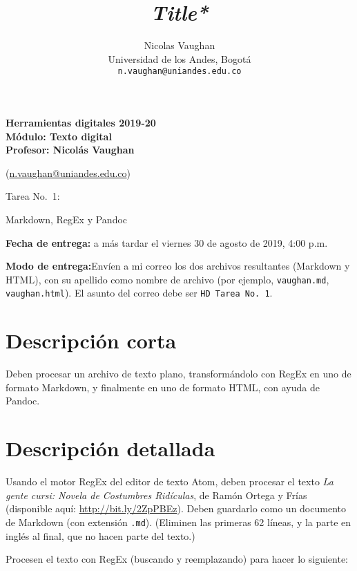 \documentclass[12pt,
              article,
              oneside
              ]{memoir}
\title{\itshape *Title*}
\author{Nicolas Vaughan\\
  Universidad de los Andes, Bogotá\\
  \texttt{n.vaughan@uniandes.edu.co}%
  }
\date{}
\begin{document}
\begin{center}
  \Large\bfseries
  Herramientas digitales 2019-20\\[6pt]

  \large
  Módulo: Texto digital\\[12pt]

\normalsize
  Profesor: Nicolás Vaughan

  (\href{mailto:n.vaughan@uniandes.edu.co}{n.vaughan@uniandes.edu.co})

\bigskip

Tarea No.~1:

Markdown, RegEx y Pandoc
\end{center}

\bigskip


\textbf{Fecha de entrega:} a más tardar el viernes 30 de agosto de 2019, 4:00 p.m.

\textbf{Modo de entrega:}Envíen a mi correo los dos archivos
resultantes (Markdown y HTML), con su apellido como
nombre de archivo (por ejemplo, \texttt{vaughan.md}, \texttt{vaughan.html}). El
asunto del correo debe ser \texttt{HD Tarea\ No.\ 1}.

\section{Descripción corta}

Deben procesar un archivo de texto plano, transformándolo con RegEx en
uno de formato Markdown, y finalmente en uno de formato HTML, con ayuda
de Pandoc.

\section{Descripción detallada}

Usando el motor RegEx del editor de texto Atom, deben procesar el texto
\emph{La gente cursi: Novela de Costumbres Ridículas}, de Ramón Ortega y
Frías (disponible aquí:
\url{http://bit.ly/2ZpPBEz}). Deben guardarlo
como un documento de Markdown (con extensión \texttt{.md}). (Eliminen
las primeras 62 líneas, y la parte en inglés al final, que no hacen
parte del texto.)

Procesen el texto con RegEx (buscando y reemplazando) para hacer lo
siguiente:
\end{document}
